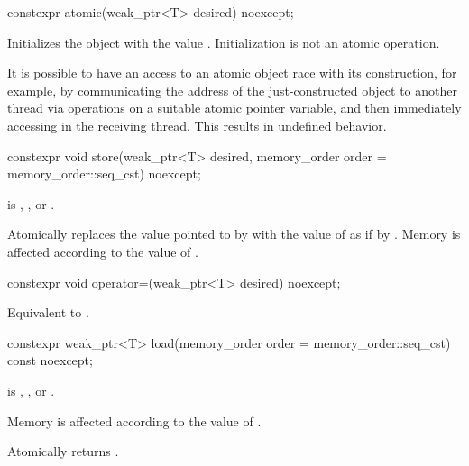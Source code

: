 %
\begin{itemdecl}
constexpr atomic(weak_ptr<T> desired) noexcept;
\end{itemdecl}

\begin{itemdescr}
\pnum
\effects
Initializes the object with the value .
Initialization is not an atomic operation.
\begin{note}
It is possible to have an access to
an atomic object  race with its construction,
for example,
by communicating the address of the just-constructed object 
to another thread via  operations
on a suitable atomic pointer variable, and
then immediately accessing  in the receiving thread.
This results in undefined behavior.
\end{note}
\end{itemdescr}

%
\begin{itemdecl}
constexpr void store(weak_ptr<T> desired, memory_order order = memory_order::seq_cst) noexcept;
\end{itemdecl}

\begin{itemdescr}
\pnum
\expects
{} is
,
, or
.

\pnum
\effects
Atomically replaces the value pointed to by  with
the value of  as if by .
Memory is affected according to the value of .
\end{itemdescr}

%
\begin{itemdecl}
constexpr void operator=(weak_ptr<T> desired) noexcept;
\end{itemdecl}

\begin{itemdescr}
\pnum
\effects
Equivalent to .
\end{itemdescr}

%
\begin{itemdecl}
constexpr weak_ptr<T> load(memory_order order = memory_order::seq_cst) const noexcept;
\end{itemdecl}

\begin{itemdescr}
\pnum
\expects
{} is
,
, or
.

\pnum
\effects
Memory is affected according to the value of .

\pnum
\returns
Atomically returns .
\end{itemdescr}

